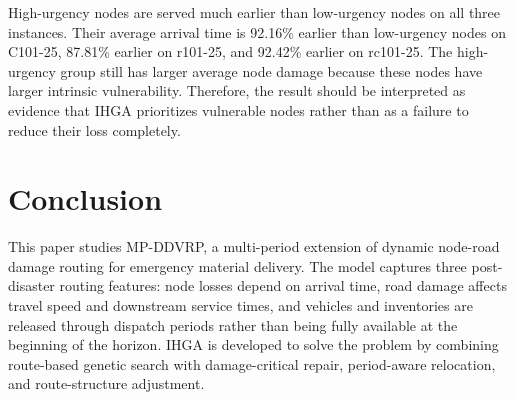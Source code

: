 ﻿\documentclass[preprint,12pt,authoryear]{elsarticle}
\begin{document}
\begin{table}[H]
\centering
\caption{Urgency-based priority analysis.}
\label{tab:priority-analysis}
\scriptsize
{}
\end{table}

High-urgency nodes are served much earlier than low-urgency nodes on all three instances. Their average arrival time is 92.16\% earlier than low-urgency nodes on C101-25, 87.81\% earlier on r101-25, and 92.42\% earlier on rc101-25. The high-urgency group still has larger average node damage because these nodes have larger intrinsic vulnerability. Therefore, the result should be interpreted as evidence that IHGA prioritizes vulnerable nodes rather than as a failure to reduce their loss completely.

\section{Conclusion}
\label{sec:conclusion}

This paper studies MP-DDVRP, a multi-period extension of dynamic node-road damage routing for emergency material delivery. The model captures three post-disaster routing features: node losses depend on arrival time, road damage affects travel speed and downstream service times, and vehicles and inventories are released through dispatch periods rather than being fully available at the beginning of the horizon. IHGA is developed to solve the problem by combining route-based genetic search with damage-critical repair, period-aware relocation, and route-structure adjustment.
\end{document}
